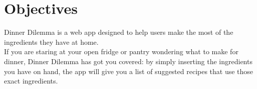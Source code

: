 \section{Objectives}

Dinner Dilemma is a web app designed to help users make the most of the ingredients they have at home.\\
If you are staring at your open fridge or pantry wondering what to make for dinner, Dinner Dilemma has got you covered: by simply inserting the ingredients you have on hand, the app will give you a list of suggested recipes that use those exact ingredients.

